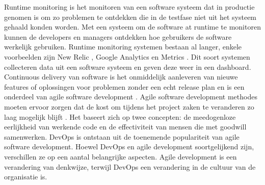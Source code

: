 Runtime monitoring is het monitoren van een software systeem dat in productie genomen is om zo problemen te ontdekken die in de testfase niet uit het systeem gehaald konden worden. Met een systeem om de software at runtime te monitoren kunnen de developers en managers ontdekken hoe gebruikers de software werkelijk gebruiken. Runtime monitoring systemen bestaan al langer, enkele voorbeelden zijn New Relic \cite{NewRelic}, Google Analytics \cite{GooAna} en Metrics \cite{Metrics}. Dit soort systemen collecteren data uit een software systeem en geven deze weer in een dashboard. \\

Continuous delivery van software is het onmiddelijk aanleveren van nieuwe features of oplossingen voor problemen zonder een echt release plan en is een onderdeel van agile software development \cite{beck2001manifesto} \cite{fowler2001agile}. Agile software development methodes moeten ervoor zorgen dat de kost om tijdens het project zaken te veranderen zo laag mogelijk blijft \cite{highsmith2001agile}. Het baseert zich op twee concepten: de meedogenloze eerlijkheid van werkende code en de effectiviteit van mensen die met goodwill samenwerken. DevOps is ontstaan uit de toenemende populariteit van agile software development. Hoewel DevOps en agile development soortgelijkend zijn, verschillen ze op een aantal belangrijke aspecten. Agile development is een verandering van denkwijze, terwijl DevOps een verandering in de cultuur van de organisatie is. \\

